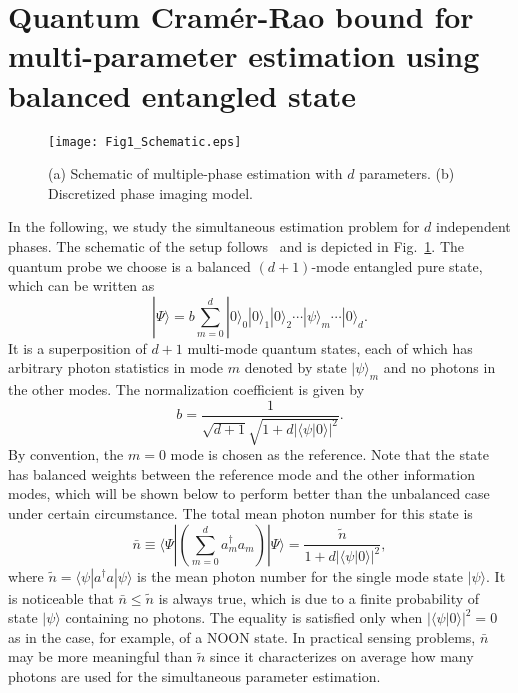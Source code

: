 \documentclass[aps,pra,reprint,showpacs,groupedaddress]{revtex4-1}
\begin{document}
\section{Quantum Cram\'er-Rao bound for multi-parameter estimation using balanced entangled state}
\begin{figure}[!t]
    \centering\texttt{[image: Fig1\_Schematic.eps]}
    \caption{(a) Schematic of multiple-phase estimation with $d$ parameters. (b) Discretized phase imaging model.}
    \label{fig:schematic}
\end{figure}
In the following, we study the simultaneous estimation problem for $d$ independent phases. The schematic of the setup follows~\cite{Humphreys2013_multi_NOON_l} and is depicted in Fig.~\ref{fig:schematic}. The quantum probe we choose is a balanced $(d+1)$-mode entangled pure state, which can be written as
\begin{equation}
    |\Psi\rangle
    =
    b\sum_{m=0}^{d}|0\rangle_0 |0\rangle_1 |0\rangle_2 \cdots |\psi\rangle_m \cdots |0\rangle_d.
    \label{eq_generalized_state}
\end{equation}
It is a superposition of $d+1$ multi-mode quantum states, each of which has arbitrary photon statistics in mode $m$ denoted by state $|\psi\rangle_m$ and no photons in the other modes. The normalization coefficient is given by
\begin{equation}
    b=\frac{1}{\sqrt{d+1}\sqrt{1+d|\langle \psi|0\rangle|^2}}.
\end{equation}
By convention, the $m=0$ mode is chosen as the reference.  Note that the state has balanced weights between the reference mode and the other information modes, which will be shown below to perform better than the unbalanced case under certain circumstance.
The total mean photon number for this state is
\begin{equation}
    \bar{n} \equiv \langle\Psi| \left(\sum_{m=0}^d a_m^\dagger a_m\right) |\Psi\rangle
    = \frac{\tilde{n}}{1+d\left|\langle\psi|0\rangle\right|^2},
\label{eq_mean_photon_number}
\end{equation}
where $\tilde{n}=\langle\psi|a^\dagger a|\psi\rangle$ is the mean photon number for the single mode state $|\psi\rangle$. It is noticeable that $\bar{n} \leq \tilde{n}$ is always true, which is due to a finite probability of state $|\psi\rangle$ containing no photons.  The equality is satisfied only when $|\langle\psi|0\rangle|^2=0$ as in the case, for example, of a NOON state.
In practical sensing problems, $\bar{n}$ may be more meaningful than $\tilde{n}$ since it characterizes on average how many photons are used for the simultaneous parameter estimation.
\end{document}
